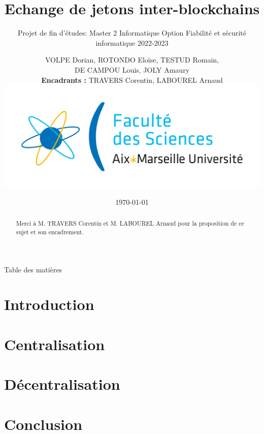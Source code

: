 \documentclass{beamer}
\title[Swap Cross-Blockchain]{Echange de jetons inter-blockchains}
\subtitle{Projet de fin d'études: Master 2 Informatique Option Fiabilité et sécurité informatique 2022-2023}
\author[M2 FSI]{VOLPE Dorian, ROTONDO Eloïse, TESTUD Romain,\\DE CAMPOU Louis, JOLY Amaury  \\ \textbf{Encadrants :} TRAVERS Corentin, LABOUREL Arnaud \\[2ex] \includegraphics[scale=0.1]{./img/amu.png}}
\institute[Aix-Marseille Université]{M2 Fiabilité et sécurité informatique}
\date{\today}
\newenvironment*{remerciements}{%
  \renewcommand*{\abstractname}{Remerciements}
  \begin{abstract}
}{
  \end{abstract}
}
\begin{document}
\maketitle

\begin{frame}
  \begin{remerciements}
    Merci à M. TRAVERS Corentin et M. LABOUREL Arnaud pour la proposition de ce sujet et son encadrement.
  \end{remerciements}
\end{frame}

\begin{frame}{Table des matières}
  \tableofcontents
\end{frame}

\section{Introduction}

\section{Centralisation}

\section{Décentralisation}

\section{Conclusion}

\end{document}
